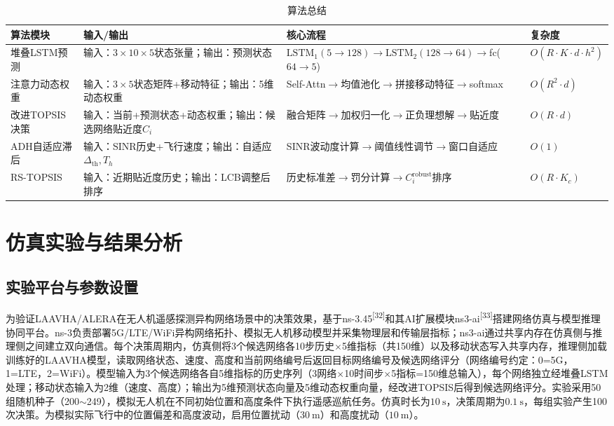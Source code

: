 \documentclass[10pt,a4paper]{ctexart}
\newcommand{\upcite}[1]{\textsuperscript{[#1]}}
\begin{document}
\begin{table}[H]
\centering
\caption{算法总结}
\small
\begin{tabular}{p{2.7cm}p{3.0cm}p{4.4cm}p{2.2cm}}
\toprule
算法模块 & 输入/输出 & 核心流程 & 复杂度 \\
\midrule
堆叠LSTM预测 & 输入：$3\times10\times5$状态张量；输出：预测状态 & $\mathrm{LSTM}_1(5\rightarrow128)\rightarrow\mathrm{LSTM}_2(128\rightarrow64)\rightarrow$fc($64\rightarrow5$) & $O(R\cdot K\cdot d\cdot h^2)$ \\
注意力动态权重 & 输入：$3\times5$状态矩阵+移动特征；输出：5维动态权重 & Self-Attn$\rightarrow$均值池化$\rightarrow$拼接移动特征$\rightarrow$softmax & $O(R^2\cdot d)$ \\
改进TOPSIS决策 & 输入：当前+预测状态+动态权重；输出：候选网络贴近度$C_i$ & 融合矩阵$\rightarrow$加权归一化$\rightarrow$正负理想解$\rightarrow$贴近度 & $O(R\cdot d)$ \\
ADH自适应滞后 & 输入：SINR历史+飞行速度；输出：自适应$\Delta_{\mathrm{th}},T_h$ & SINR波动度计算$\rightarrow$阈值线性调节$\rightarrow$窗口自适应 & $O(1)$ \\
RS-TOPSIS & 输入：近期贴近度历史；输出：LCB调整后排序 & 历史标准差$\rightarrow$罚分计算$\rightarrow C_i^{\mathrm{robust}}$排序 & $O(R\cdot K_c)$ \\
\bottomrule
\end{tabular}
\label{tab:complexity}
\end{table}

\section{仿真实验与结果分析}

\subsection{实验平台与参数设置}

为验证LAAVHA/ALERA在无人机遥感探测异构网络场景中的决策效果，基于ns-3.45\upcite{32}和其AI扩展模块ns3-ai\upcite{33}搭建网络仿真与模型推理协同平台。ns-3负责部署5G/LTE/WiFi异构网络拓扑、模拟无人机移动模型并采集物理层和传输层指标；ns3-ai通过共享内存在仿真侧与推理侧之间建立双向通信。每个决策周期内，仿真侧将3个候选网络各10步历史$\times$5维指标（共150维）以及移动状态写入共享内存，推理侧加载训练好的LAAVHA模型，读取网络状态、速度、高度和当前网络编号后返回目标网络编号及候选网络评分（网络编号约定：0=5G，1=LTE，2=WiFi）。模型输入为3个候选网络各自5维指标的历史序列（3网络$\times$10时间步$\times$5指标=150维总输入），每个网络独立经堆叠LSTM处理；移动状态输入为2维（速度、高度）；输出为5维预测状态向量及5维动态权重向量，经改进TOPSIS后得到候选网络评分。实验采用50组随机种子（200$\sim$249），模拟无人机在不同初始位置和高度条件下执行遥感巡航任务。仿真时长为$10~\mathrm{s}$，决策周期为$0.1~\mathrm{s}$，每组实验产生100次决策。为模拟实际飞行中的位置偏差和高度波动，启用位置扰动（$30~\mathrm{m}$）和高度扰动（$10~\mathrm{m}$）。
\end{document}
